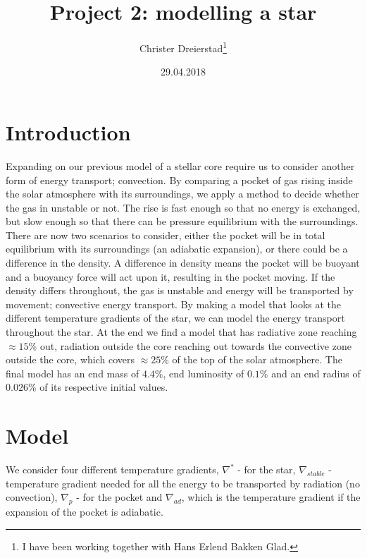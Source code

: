 \documentclass[a4paper,10pt]{article}
\title{Project 2: modelling a star}
\author{Christer Dreierstad\footnote{I have been working together with Hans Erlend Bakken Glad.}}
\date{29.04.2018}
\begin{document}
\maketitle
\section{Introduction}
Expanding on our previous model of a stellar core require us to consider another form of energy transport; convection. By comparing a pocket of gas rising inside the solar atmosphere 
with its surroundings, we apply a method to decide whether the gas in unstable or not. The rise is fast enough so that no energy is exchanged, but slow enough so that there can be pressure equilibrium with the surroundings. There are now two scenarios to consider, either the pocket will be in total equilibrium with its surroundings (an adiabatic expansion), or there could be a difference in the density. A difference in density means the pocket will be buoyant and a buoyancy force will act upon it, resulting in the pocket moving. If the density differs throughout, the gas is unstable and energy will be transported by movement; convective energy transport. By making a model that looks at the different temperature gradients of the star, we can model the energy transport throughout the star. At the end we find a model that has radiative zone reaching $\approx 15$\% out, radiation outside the core reaching out towards the convective zone outside the core, which covers $\approx 25$\% of the top of the solar atmosphere. The final model has an end mass of $4.4\%$, end luminosity of $0.1\%$ and an end radius of $0.026\%$ of its respective initial values. 


\section{Model}
We consider four different temperature gradients, $\nabla^*$ - for the star, $\nabla_{stable}$ - temperature gradient needed for all the energy to be transported by radiation (no convection), $\nabla_p$ - for the pocket and $\nabla_{ad}$, which is the temperature gradient if the expansion of the pocket is adiabatic. 
\end{document}
